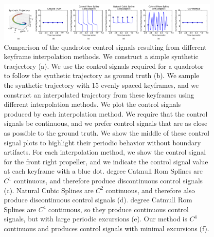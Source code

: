 \begin{figure}[t]
\centering
\includegraphics[width=6.0in]{images/2015_siggraph_asia_supplementary/method_comparison}
\caption{
Comparison of the quadrotor control signals resulting from different keyframe interpolation methods.
We construct a simple synthetic traejectory (a). We use the control signals required for a  quadrotor to follow the synthetic trajectory as ground truth (b).
We sample the synthetic trajectory with 15 evenly spaced keyframes, and we construct an interpolated trajectory from these keyframes using different interpolation methods.
We plot the control signals produced by each interpolation method. We require that the control signals be continuous, and we prefer control signals that are as close as possible to the ground truth. We show the middle of these control signal plots to highlight their periodic behavior without boundary artifacts.
For each interpolation method, we show the control signal for the front right propeller, and we indicate the control signal value at each keyframe with a blue dot.
 degree Catmull Rom Splines are $C^1$ continuous, and therefore produce discontinuous control signals (c).
Natural Cubic Splines are $C^2$ continuous, and therefore also produce discontinuous control signals (d).
 degree Catmull Rom Splines are $C^4$ continuous, so they produce continuous control signals, but with large periodic excursions (e).
Our method is $C^4$ continuous and produces control signals with minimal excursions (f). 
}
\label{fig:ch2:method_comparison}
\end{figure}

